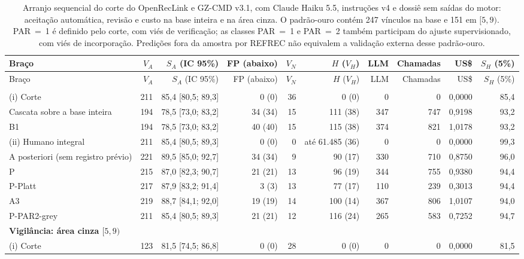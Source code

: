 \begingroup
\scriptsize
\setlength{\tabcolsep}{2pt}
\begin{longtable}{lrrrrrrrrr}
\caption{Arranjo sequencial do corte do OpenRecLink e GZ-CMD v3.1, com Claude Haiku 5.5, instruções v4 e dossiê sem saídas do motor: aceitação automática, revisão e custo na base inteira e na área cinza. O padrão-ouro contém 247 vínculos na base e 151 em $[5,9)$. PAR~=~1 é definido pelo corte, com viés de verificação; as classes PAR~=~1 e PAR~=~2 também participam do ajuste supervisionado, com viés de incorporação. Predições fora da amostra por REFREC não equivalem a validação externa desse padrão-ouro.}
\label{tab:cap8-arranjo-corte}\\
\toprule
Braço & $V_A$ & $S_A$ (IC 95\%) & FP (abaixo) & $V_N$ & $H$ ($V_H$) & LLM & Chamadas & US\$ & $S_H$ (5\%) \\
\midrule
\endfirsthead
\toprule
Braço & $V_A$ & $S_A$ (IC 95\%) & FP (abaixo) & $V_N$ & $H$ ($V_H$) & LLM & Chamadas & US\$ & $S_H$ (5\%) \\
\midrule
\endhead
\bottomrule
\endlastfoot
\multicolumn{10}{l}{\textbf{Vigilância: base inteira}} \\
(i) Corte & 211 & 85,4 [80,5; 89,3] & 0 (0) & 36 & 0 (0) & 0 & 0 & 0,0000 & 85,4 \\
Cascata sobre a base inteira & 194 & 78,5 [73,0; 83,2] & 34 (34) & 15 & 111 (38) & 347 & 747 & 0,9198 & 93,2 \\
B1 & 194 & 78,5 [73,0; 83,2] & 40 (40) & 15 & 115 (38) & 374 & 821 & 1,0178 & 93,2 \\
(ii) Humano integral & 211 & 85,4 [80,5; 89,3] & 0 (0) & 0 & até 61.485 (36) & 0 & 0 & 0,0000 & 99,3 \\
A posteriori (sem registro prévio) & 221 & 89,5 [85,0; 92,7] & 34 (34) & 9 & 90 (17) & 330 & 710 & 0,8750 & 96,0 \\
P & 215 & 87,0 [82,3; 90,7] & 21 (21) & 13 & 96 (19) & 344 & 755 & 0,9380 & 94,4 \\
P-Platt & 217 & 87,9 [83,2; 91,4] & 3 (3) & 13 & 77 (17) & 110 & 239 & 0,3013 & 94,4 \\
A3 & 219 & 88,7 [84,1; 92,0] & 19 (19) & 14 & 100 (14) & 367 & 806 & 1,0107 & 94,0 \\
P-PAR2-grey & 211 & 85,4 [80,5; 89,3] & 21 (21) & 12 & 116 (24) & 265 & 583 & 0,7252 & 94,7 \\
\midrule
\multicolumn{10}{l}{\textbf{Vigilância: área cinza $[5,9)$}} \\
(i) Corte & 123 & 81,5 [74,5; 86,8] & 0 (0) & 28 & 0 (0) & 0 & 0 & 0,0000 & 81,5 \\

\end{longtable}
